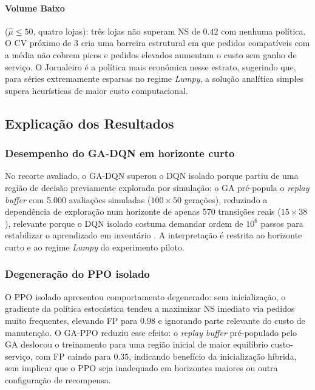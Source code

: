 \paragraph{Volume Baixo} ($\hat{\mu} \leq 50$, quatro lojas): três lojas não superam NS de $0.42$ com nenhuma política. O CV próximo de 3 cria uma barreira estrutural em que pedidos compatíveis com a média não cobrem picos e pedidos elevados aumentam o custo sem ganho de serviço. O Jornaleiro é a política mais econômica nesse estrato, sugerindo que, para séries extremamente esparsas no regime \textit{Lumpy}, a solução analítica simples supera heurísticas de maior custo computacional.

\subsection{Explicação dos Resultados}

\subsubsection*{Desempenho do GA-DQN em horizonte curto}

No recorte avaliado, o GA-DQN superou o DQN isolado porque partiu de uma região de decisão previamente explorada por simulação: o GA pré-popula o \textit{replay buffer} com 5.000 avaliações simuladas ($100 \times 50$ gerações), reduzindo a dependência de exploração num horizonte de apenas 570 transições reais ($15 \times 38$), relevante porque o DQN isolado costuma demandar ordem de $10^6$ passos para estabilizar o aprendizado em inventário \citep{Oroojlooyjadid2022BeerGameDQN}. A interpretação é restrita ao horizonte curto e ao regime \textit{Lumpy} do experimento piloto.

\subsubsection*{Degeneração do PPO isolado}

O PPO isolado apresentou comportamento degenerado: sem inicialização, o gradiente da política estocástica tendeu a maximizar NS imediato via pedidos muito frequentes, elevando FP para $0.98$ e ignorando parte relevante do custo de manutenção. O GA-PPO reduziu esse efeito: o \textit{replay buffer} pré-populado pelo GA deslocou o treinamento para uma região inicial de maior equilíbrio custo-serviço, com FP caindo para $0.35$, indicando benefício da inicialização híbrida, sem implicar que o PPO seja inadequado em horizontes maiores ou outra configuração de recompensa.

